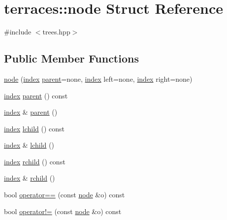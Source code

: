 \hypertarget{structterraces_1_1node}{}\section{terraces\+:\+:node Struct Reference}
\label{structterraces_1_1node}


{\ttfamily \#include $<$trees.\+hpp$>$}

\subsection*{Public Member Functions}
\begin{DoxyCompactItemize}
\item 
\hyperlink{structterraces_1_1node_aeeaecca04dbbd90b944666d8e1a5c3dc}{node} (\hyperlink{namespaceterraces_adbc33ccb543d1634e96d0eb02e472c77}{index} \hyperlink{structterraces_1_1node_a0dc3c66ea9c5d75867cf529de3d78598}{parent}=none, \hyperlink{namespaceterraces_adbc33ccb543d1634e96d0eb02e472c77}{index} left=none, \hyperlink{namespaceterraces_adbc33ccb543d1634e96d0eb02e472c77}{index} right=none)
\item 
\hyperlink{namespaceterraces_adbc33ccb543d1634e96d0eb02e472c77}{index} \hyperlink{structterraces_1_1node_a0dc3c66ea9c5d75867cf529de3d78598}{parent} () const
\item 
\hyperlink{namespaceterraces_adbc33ccb543d1634e96d0eb02e472c77}{index} \& \hyperlink{structterraces_1_1node_a702158876a59ff469fa1e1fd5a5bca45}{parent} ()
\item 
\hyperlink{namespaceterraces_adbc33ccb543d1634e96d0eb02e472c77}{index} \hyperlink{structterraces_1_1node_a934dadc0e2108504ac7634300d27c3b0}{lchild} () const
\item 
\hyperlink{namespaceterraces_adbc33ccb543d1634e96d0eb02e472c77}{index} \& \hyperlink{structterraces_1_1node_a4df948704080a44771de4909dd94699a}{lchild} ()
\item 
\hyperlink{namespaceterraces_adbc33ccb543d1634e96d0eb02e472c77}{index} \hyperlink{structterraces_1_1node_ab6022c07498a4b1cb9e737fa0ffe4278}{rchild} () const
\item 
\hyperlink{namespaceterraces_adbc33ccb543d1634e96d0eb02e472c77}{index} \& \hyperlink{structterraces_1_1node_a7d53d6f802bc0fa727c67a72033c15ad}{rchild} ()
\item 
bool \hyperlink{structterraces_1_1node_ad0776c1f5b296a8cf52925b4e497814a}{operator==} (const \hyperlink{structterraces_1_1node}{node} \&o) const
\item 
bool \hyperlink{structterraces_1_1node_aebef4e5aff81c490f0fa4ee5ef146484}{operator!=} (const \hyperlink{structterraces_1_1node}{node} \&o) const
\end{DoxyCompactItemize}
